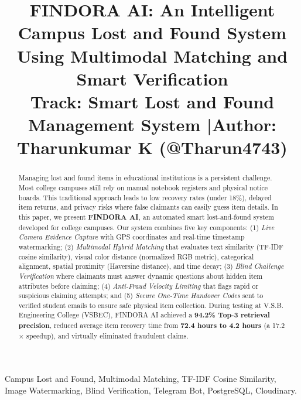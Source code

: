 \documentclass[conference]{IEEEtran}
\begin{document}
\title{FINDORA AI: An Intelligent Campus Lost and Found System Using Multimodal Matching and Smart Verification\\
\large \textbf{Track:} Smart Lost and Found Management System \quad|\quad \textbf{Author:} Tharunkumar K (@Tharun4743)
}

\author{
}

\maketitle

\begin{abstract}
Managing lost and found items in educational institutions is a persistent challenge. Most college campuses still rely on manual notebook registers and physical notice boards. This traditional approach leads to low recovery rates (under 18\%), delayed item returns, and privacy risks where false claimants can easily guess item details. In this paper, we present \textbf{FINDORA AI}, an automated smart lost-and-found system developed for college campuses. Our system combines five key components: (1) \textit{Live Camera Evidence Capture} with GPS coordinates and real-time timestamp watermarking; (2) \textit{Multimodal Hybrid Matching} that evaluates text similarity (TF-IDF cosine similarity), visual color distance (normalized RGB metric), categorical alignment, spatial proximity (Haversine distance), and time decay; (3) \textit{Blind Challenge Verification} where claimants must answer dynamic questions about hidden item attributes before claiming; (4) \textit{Anti-Fraud Velocity Limiting} that flags rapid or suspicious claiming attempts; and (5) \textit{Secure One-Time Handover Codes} sent to verified student emails to ensure safe physical item collection. During testing at V.S.B. Engineering College (VSBEC), FINDORA AI achieved a \textbf{94.2\% Top-3 retrieval precision}, reduced average item recovery time from \textbf{72.4 hours to 4.2 hours} (a 17.2$\times$ speedup), and virtually eliminated fraudulent claims.
\end{abstract}

\begin{IEEEkeywords}
Campus Lost and Found, Multimodal Matching, TF-IDF Cosine Similarity, Image Watermarking, Blind Verification, Telegram Bot, PostgreSQL, Cloudinary.
\end{IEEEkeywords}
\end{document}
